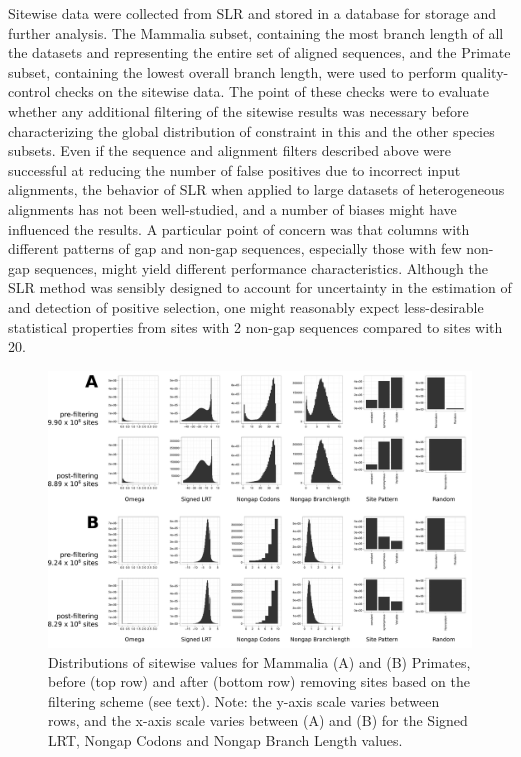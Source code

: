 Sitewise data were collected from SLR and stored in a database for
storage and further analysis. The Mammalia subset, containing the most
branch length of all the datasets and representing the entire set of
aligned sequences, and the Primate subset, containing the lowest
overall branch length, were used to perform quality-control checks on
the sitewise data. The point of these checks were to evaluate whether
any additional filtering of the sitewise results was necessary before
characterizing the global distribution of constraint in this and the
other species subsets. Even if the sequence and alignment filters
described above were successful at reducing the number of false
positives due to incorrect input alignments, the behavior of SLR when
applied to large datasets of heterogeneous alignments has not been
well-studied, and a number of biases might have influenced the
results. A particular point of concern was that columns with different
patterns of gap and non-gap sequences, especially those with few
non-gap sequences, might yield different performance
characteristics. Although the SLR method was sensibly designed to
account for uncertainty in the estimation of \omg and detection of
positive selection, one might reasonably expect less-desirable
statistical properties from sites with 2 non-gap sequences compared to
sites with 20.

\begin{landscape}
\begin{figure}
\centering
\includegraphics[scale=0.42]{Figs/qc_hist_mammals_primates.pdf}
\caption{Distributions of sitewise values for Mammalia (A) and (B)
  Primates, before (top row) and after (bottom row) removing sites
  based on the filtering scheme (see text). Note: the y-axis scale
  varies between rows, and the x-axis scale varies between (A) and (B)
  for the Signed LRT, Nongap Codons and Nongap Branch Length values.}
\label{qc_hist_mammals_primates}
\end{figure}
\end{landscape}
 
